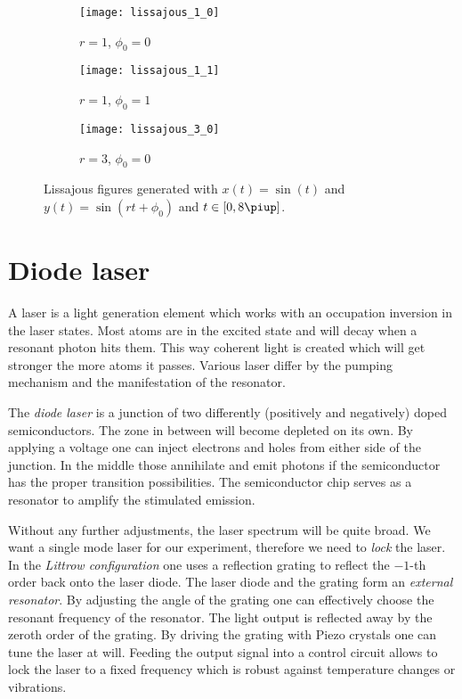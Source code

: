 \documentclass[11pt, english, fleqn, DIV=15, headinclude, BCOR=2cm]{scrreprt}
\begin{document}
\begin{figure}
    \begin{subfigure}[c]{0.3\linewidth}
        \centering
        \texttt{[image: lissajous\_1\_0]}
        \caption{%
            $r = 1$, $\phi_0 = 0$
            }
    \end{subfigure}
    \hfill
    \begin{subfigure}[c]{0.3\linewidth}
        \centering
        \texttt{[image: lissajous\_1\_1]}
        \caption{%
            $r = 1$, $\phi_0 = 1$
            }
    \end{subfigure}
    \hfill
    \begin{subfigure}[c]{0.3\linewidth}
        \centering
        \texttt{[image: lissajous\_3\_0]}
        \caption{%
            $r = 3$, $\phi_0 = 0$
            }
    \end{subfigure}
    \caption{%
        Lissajous figures generated with $x(t) = \sin(t)$ and $y(t) = \sin(rt +
        \phi_0)$ and $t \in [0, 8 \piup]$.
        }
    \label{fig:lissajous-generated}
\end{figure}


\section{Diode laser}
\label{sec:diode_laser}

A laser is a light generation element which works with an occupation inversion
in the laser states. Most atoms are in the excited state and will decay when a
resonant photon hits them. This way coherent light is created which will get
stronger the more atoms it passes. Various laser differ by the pumping
mechanism and the manifestation of the resonator.

The \emph{diode laser} is a junction of two differently (positively and
negatively) doped semiconductors. The zone in between will become depleted on
its own. By applying a voltage one can inject electrons and holes from either
side of the junction. In the middle those annihilate and emit photons if the
semiconductor has the proper transition possibilities. The semiconductor chip
serves as a resonator to amplify the stimulated emission.

Without any further adjustments, the laser spectrum will be quite broad. We
want a single mode laser for our experiment, therefore we need to \emph{lock}
the laser. In the \emph{Littrow configuration} one uses a reflection grating to
reflect the $-1$-th order back onto the laser diode. The laser diode and the
grating form an \emph{external resonator}. By adjusting the angle of the
grating one can effectively choose the resonant frequency of the resonator. The
light output is reflected away by the zeroth order of the grating. By driving
the grating with Piezo crystals one can tune the laser at will. Feeding the
output signal into a control circuit allows to lock the laser to a fixed
frequency which is robust against temperature changes or vibrations.
\end{document}
